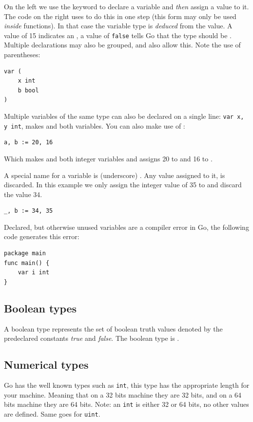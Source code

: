 On the left we use the
 keyword to declare a variable and \emph{then} assign a value to
it. The code on the right uses \mbox{\key{:=}{ }} to do this in one
step (this form may only be used \emph{inside} functions).
In that case the variable
type is \emph{deduced} from the value. A value of 15 indicates an ,
a value of \texttt{false} tells Go that the type should be . 
Multiple  declarations may also be grouped, 
and  also allow this. Note the use of parentheses:
\begin{lstlisting}
var (
    x int
    b bool
)
\end{lstlisting}
Multiple variables of the same type can also be declared on a
single line: \lstinline{var x, y int}, makes  and  both
 variables. You can also make use of :
\begin{lstlisting}
a, b := 20, 16
\end{lstlisting}
Which makes  and  both integer variables and assigns
20 to  and 16 to .

A special name for a variable is \var{\textbf{\_}} 
(underscore) . Any value
assigned to it, is discarded. In this example we only assign the integer
value of 35 to  and discard the value 34.
\begin{lstlisting}
_, b := 34, 35
\end{lstlisting}
Declared, but otherwise unused variables are a compiler error in Go, the
following code generates this error:

\begin{lstlisting}
package main
func main() { 
    var i int
}
\end{lstlisting}

\subsection{Boolean types}
A boolean type represents the set of boolean truth values denoted by the
predeclared constants \emph{true} and \emph{false}. The boolean type is .

\subsection{Numerical types}
Go has the well known types such as \lstinline{int}, this type
has the appropriate length for your machine. 
Meaning that on a 32 bits machine they are 32 bits, and on
a 64 bits machine they are 64 bits. Note: an \lstinline{int} is
either 32 or 64 bits, no other values are defined. Same goes 
for \lstinline{uint}.

